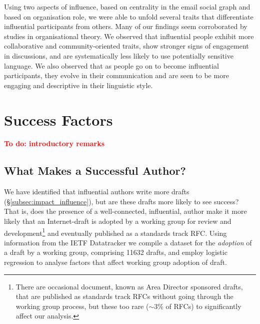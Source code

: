 \documentclass[twocolumn,10pt]{article}
\newcommand{\todo}[1]{\textbf{\textcolor{red}{To do: #1}}}
\newcommand{\pb}[1]{\vspace{0.75ex}\noindent{\textbf{#1}}}
\begin{document}
\pb{Summary:}
Using two aspects of influence, based on centrality in the email social
graph and based on organisation role, we were able to unfold several
traits that differentiate influential participants from others. Many
of our findings seem corroborated by studies in organisational theory.
We observed that influential people exhibit more collaborative and
community-oriented traits, show stronger signs of engagement in
discussions, and are systematically less likely to use potentially
sensitive language.
We also observed that as people go on to become influential participants,
they evolve in their communication and are seen to be more engaging and
descriptive in their linguistic style. 


\section{Success Factors}
\label{sec:success-factors}

\todo{introductory remarks}

\subsection{What Makes a Successful Author?}

We have identified that influential authors write more drafts
(\S\ref{subsec:impact_influence}), but are these drafts more likely to
see success?  That is, does the presence of a well-connected, influential,
author make it more likely that an Internet-draft is adopted by a working
group for review and development\footnote{There are occasional document,
known as Area Director sponsored drafts, that are published as standards
track RFCs without going through the working group process, but these too
rare ($\sim$3\% of RFCs) to significantly affect our analysis.} and
eventually published as a standards track RFC.  Using information from the
IETF Datatracker we compile a dataset for the \emph{adoption} of a draft by
a working group, comprising 11632 drafts, and employ logistic regression to
analyse factors that affect working group adoption of draft.
\end{document}
